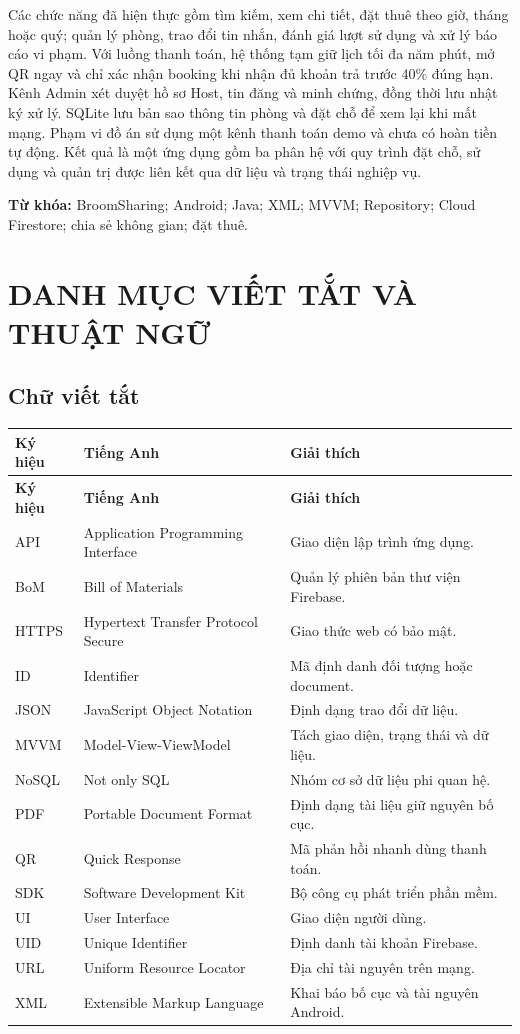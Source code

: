 \documentclass[12pt,a4paper]{article}
\numberwithin{figure}{subsection}
\numberwithin{table}{subsection}
\renewcommand{\arraystretch}{1.18}
\begin{document}
Các chức năng đã hiện thực gồm tìm kiếm, xem chi tiết, đặt thuê theo giờ, tháng hoặc quý; quản lý phòng, trao đổi tin nhắn, đánh giá lượt sử dụng và xử lý báo cáo vi phạm. Với luồng thanh toán, hệ thống tạm giữ lịch tối đa năm phút, mở QR ngay và chỉ xác nhận booking khi nhận đủ khoản trả trước 40\% đúng hạn. Kênh Admin xét duyệt hồ sơ Host, tin đăng và minh chứng, đồng thời lưu nhật ký xử lý. SQLite lưu bản sao thông tin phòng và đặt chỗ để xem lại khi mất mạng. Phạm vi đồ án sử dụng một kênh thanh toán demo và chưa có hoàn tiền tự động. Kết quả là một ứng dụng gồm ba phân hệ với quy trình đặt chỗ, sử dụng và quản trị được liên kết qua dữ liệu và trạng thái nghiệp vụ.

\noindent\textbf{Từ khóa:} BroomSharing; Android; Java; XML; MVVM; Repository; Cloud Firestore; chia sẻ không gian; đặt thuê.
\clearpage
\section*{DANH MỤC VIẾT TẮT VÀ THUẬT NGỮ}
\begingroup\small{}\renewcommand{\arraystretch}{1.04}
\setlength{\LTpre}{4pt}\setlength{\LTpost}{4pt}
\subsection*{Chữ viết tắt}
\begin{longtable}{@{}p{1.8cm}p{6cm}p{7cm}@{}}\toprule
\textbf{Ký hiệu}&\textbf{Tiếng Anh}&\textbf{Giải thích}\\\midrule\endfirsthead
\toprule\textbf{Ký hiệu}&\textbf{Tiếng Anh}&\textbf{Giải thích}\\\midrule\endhead
API& Application Programming Interface & Giao diện lập trình ứng dụng.\\
BoM& Bill of Materials & Quản lý phiên bản thư viện Firebase.\\
HTTPS& Hypertext Transfer Protocol Secure & Giao thức web có bảo mật.\\
ID& Identifier & Mã định danh đối tượng hoặc document.\\
JSON& JavaScript Object Notation & Định dạng trao đổi dữ liệu.\\
MVVM& Model-View-ViewModel & Tách giao diện, trạng thái và dữ liệu.\\
NoSQL& Not only SQL & Nhóm cơ sở dữ liệu phi quan hệ.\\
PDF& Portable Document Format & Định dạng tài liệu giữ nguyên bố cục.\\
QR& Quick Response & Mã phản hồi nhanh dùng thanh toán.\\
SDK& Software Development Kit & Bộ công cụ phát triển phần mềm.\\
UI& User Interface & Giao diện người dùng.\\
UID& Unique Identifier & Định danh tài khoản Firebase.\\
URL& Uniform Resource Locator & Địa chỉ tài nguyên trên mạng.\\
XML& Extensible Markup Language & Khai báo bố cục và tài nguyên Android.\\\bottomrule\end{longtable}
\end{document}

